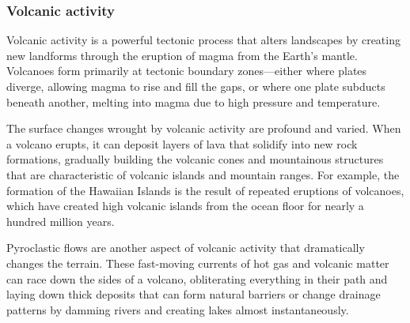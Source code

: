 

\subsubsection{Volcanic activity}
Volcanic activity is a powerful tectonic process that alters landscapes by creating new landforms through the eruption of magma from the Earth's mantle. Volcanoes form primarily at tectonic boundary zones—either where plates diverge, allowing magma to rise and fill the gaps, or where one plate subducts beneath another, melting into magma due to high pressure and temperature.

The surface changes wrought by volcanic activity are profound and varied. When a volcano erupts, it can deposit layers of lava that solidify into new rock formations, gradually building the volcanic cones and mountainous structures that are characteristic of volcanic islands and mountain ranges. For example, the formation of the Hawaiian Islands is the result of repeated eruptions of volcanoes, which have created high volcanic islands from the ocean floor for nearly a hundred million years.


Pyroclastic flows are another aspect of volcanic activity that dramatically changes the terrain. These fast-moving currents of hot gas and volcanic matter can race down the sides of a volcano, obliterating everything in their path and laying down thick deposits that can form natural barriers or change drainage patterns by damming rivers and creating lakes almost instantaneously.


